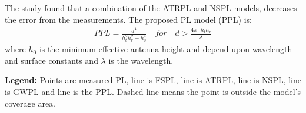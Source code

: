 \large

\begin{minipage}{.45\textwidth}
The study found that a combination of the ATRPL and NSPL models, decreases the error from the measurements. The proposed PL model (PPL) is:
\vspace{-0.5em}\begin{align*}
PPL = \frac{d^4}{h_t^2 h_r^2+h_0^4}\quad for \quad d > \frac{4\pi\cdot h_th_r}{\lambda}
\end{align*}
where $h_0$ is the minimum effective antenna height and depend upon wavelength and surface constants and $\lambda$ is the wavelength.


\end{minipage}%
\hspace{1cm}
\begin{minipage}{0.45\textwidth}
\begin{center}

\end{center}
\end{minipage}

\vspace{0.5em}
\begin{minipage}{0.5\textwidth}
\begin{center}

\end{center}
\end{minipage}
\begin{minipage}{0.5\textwidth}
\begin{center}

\end{center}
\end{minipage}

\vspace{0.5em}
\textbf{Legend:} Points are measured PL, \textcolor{thomasblue}{line} is FSPL, \textcolor{thomasred}{line} is ATRPL, \textcolor{thomasgreen}{line} is NSPL, \textcolor{thomaspurple}{line} is GWPL and \textcolor{thomasyellow}{line} is the PPL. Dashed line means the point is outside the model's coverage area.\\
